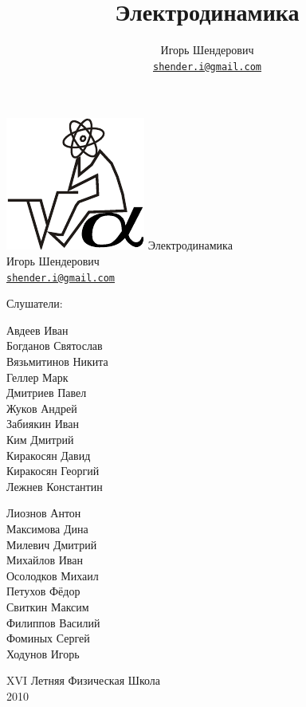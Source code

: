 \documentclass[12pt,a4paper]{article}
\title{Электродинамика}
\author{Игорь Шендерович\\\texttt{\href{mailto:shender.i@gmail.com}{shender.i@gmail.com}}}
\numberwithin{equation}{section}
\numberwithin{equation}{section}
\begin{document}
\hypersetup{colorlinks,%
  citecolor=blue,
  urlcolor=blue,
  linkcolor=red
}

\thispagestyle{empty}
\begin{center}
  \includegraphics{logo}
  \vfill
  \LARGE{Электродинамика}\\[0.3cm]
  \Large{Игорь Шендерович}\\[0.3cm]
  {\large{\texttt{\href{mailto:shender.i@gmail.com}{shender.i@gmail.com}}}}\\[1cm]
  \large{Слушатели:\\[0.5cm]
  \hspace{2cm}\parbox[t]{0.4\textwidth}{ 
      Авдеев Иван\\
      Богданов Святослав\\
      Вязьмитинов Никита\\
      Геллер Марк\\
      Дмитриев Павел\\
      Жуков Андрей\\
      Забиякин Иван\\
      Ким Дмитрий\\
      Киракосян Давид\\
      Киракосян Георгий\\
      Лежнев Константин\\
      }
      \hspace{1cm}
      \parbox[t]{0.4\textwidth}{
      Лиознов Антон\\
      Максимова Дина\\
      Милевич Дмитрий\\
      Михайлов Иван\\
      Осолодков Михаил\\
      Петухов Фёдор\\
      Свиткин Максим\\
      Филиппов Василий\\
      Фоминых Сергей\\
      Ходунов Игорь}}
  \vfill
  
  \normalsize{\textsf{XVI Летняя Физическая Школа\\
  2010}}
\end{center}
\end{document}
